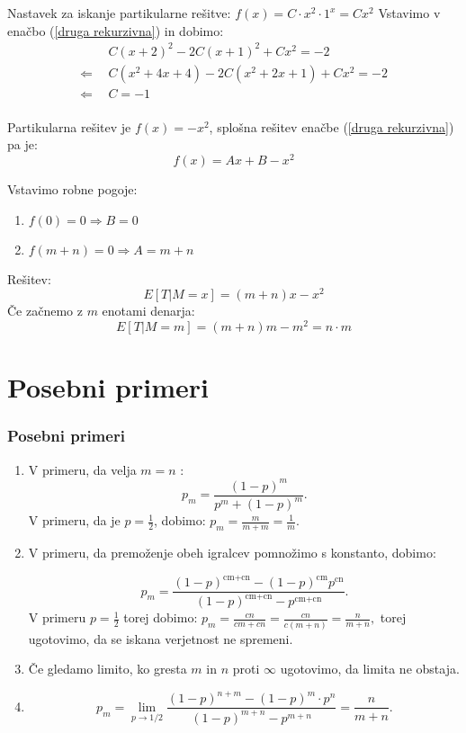 \documentclass[10pt]{beamer}
\begin{document}
\begin{frame}
Nastavek za iskanje partikularne rešitve: $f(x)=C\cdot x^2\cdot 1^x= Cx^2$
 Vstavimo v enačbo (\ref{druga rekurzivna}) in dobimo:
\begin{equation*}
\begin{split}
 & ~~C(x+2)^2-2C(x+1)^2+Cx^2=-2\\
\Leftarrow & ~~C(x^2+4x+4)-2C(x^2+2x+1)+Cx^2=-2\\
\Leftarrow &  ~~C = -1 \\
\end{split}
\end{equation*}

Partikularna rešitev je $f(x)=-x^2$, splošna rešitev enačbe (\ref{druga rekurzivna}) pa je: $$f(x)=Ax+B-x^2$$

Vstavimo robne pogoje:
\begin{enumerate}
\item $f(0)=0\Rightarrow B = 0$
\item $f(m+n)=0 \Rightarrow A = m+n$
\end{enumerate}
Rešitev: $$E[T|M=x]= (m+n)x-x^2$$
Če začnemo z $m$ enotami denarja:$$E[T|M=m]=(m+n)m-m^2= n\cdot m$$
\end{frame}


\section[Posebni primeri]{Posebni primeri}
\begin{frame}
\frametitle{Posebni primeri}
\begin{enumerate}
\item V primeru, da velja $m = n$ : $$p_m = \frac{(1-p)^m}{p^m+(1-p)^m}.$$
V primeru, da je $p = \frac{1}{2}$, dobimo: 
$p_m = \frac{m}{m + m} = \frac{1}{m}.$
\item V primeru, da premoženje obeh igralcev pomnožimo s konstanto, dobimo:

$$p_m = \frac{(1-p)^{\text{cm}+\text{cn}}-(1-p)^{\text{cm}} p^{\text{cn}}}{(1-p)^{\text{cm}+\text{cn}}-p^{\text{cm}+\text{cn}}}.$$
V primeru $p = \frac{1}{2}$ torej dobimo: 
$p_m = \frac{cn}{cm + cn} = \frac{cn}{c(m + n)} = \frac{n}{m + n},$ torej ugotovimo, da se iskana verjetnost ne spremeni. 

\item Če gledamo limito, ko gresta $m$ in $n$ proti $\infty$ ugotovimo, da limita ne obstaja.
\item $$p_m = \lim_{p \to 1/2}  \frac{(1-p)^{n+m} - (1-p)^m \cdot p^n}{(1-p)^{m+n} - p^{m+n}}  =\frac{n}{m + n}.$$
\end{enumerate}
\end{frame}
\end{document}

